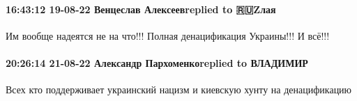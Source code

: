 \paragraph{16:43:12 19-08-22 Венцеслав Алексеевreplied to 🇷🇺Zлая}

Им вообще надеятся не на что!!! Полная денацификация Украины!!! И всё!!!

\paragraph{20:26:14 21-08-22 Александр Пархоменкоreplied to ВЛАДИМИР}

Всех кто поддерживает украинский нацизм и киевскую хунту на денацификацию

